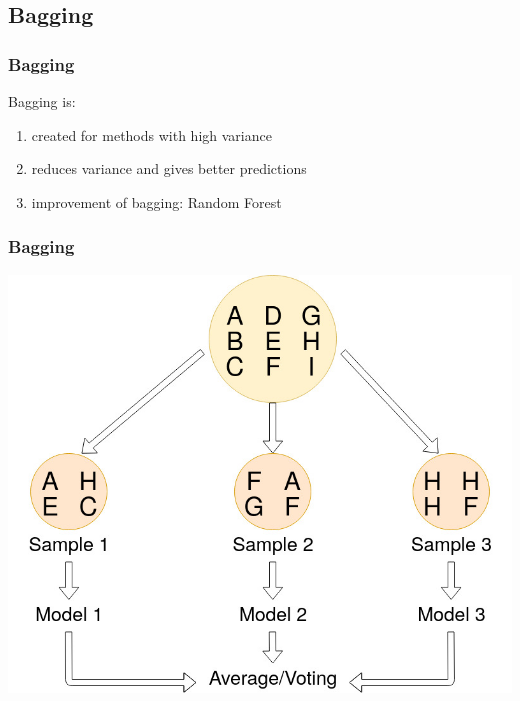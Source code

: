 \subsection{Bagging}

\begin{frame}
    \frametitle{Bagging}

	Bagging is:
    \begin{enumerate}
    \item created for methods with high variance
    \item reduces variance and gives better predictions
    \item improvement of bagging: 
    \newline Random Forest
    \end{enumerate}
    

\end{frame}

\begin{frame}
    \frametitle{Bagging}

	\begin{center}		
		\includegraphics[height=0.7\textheight]{images/bagging_1.jpg}
	\end{center}

\end{frame}